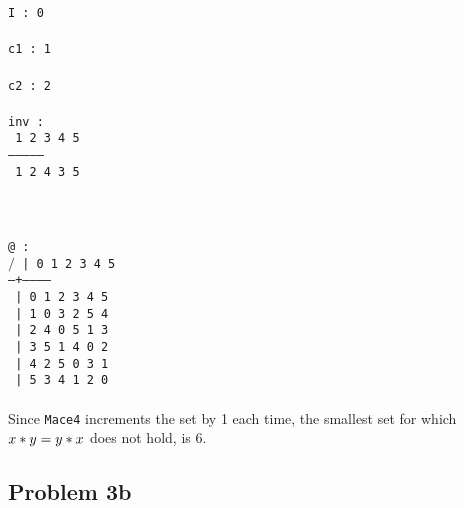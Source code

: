 \documentclass[a4paper]{article}
\begin{document}
	{\tt I : 0}\\
	{\tt }\\
	{\tt c1 : 1}\\
	{\tt }\\
	{\tt c2 : 2}\\
	{\tt }\\
	{\tt inv :}\\
	{\tt {} 1 2 3 4 5}\\
	{\tt ---------------}\\
	{\tt {} 1 2 4 3 5}\\
	{\tt }\\
	\\
	\\
	{\tt @ :}\\
	{\tt \indent $/$ | 0 1 2 3 4 5}\\
	{\tt \indent --+------------}\\
	{\tt {} | 0 1 2 3 4 5}\\
	{\tt {} | 1 0 3 2 5 4}\\
	{\tt {} | 2 4 0 5 1 3}\\
	{\tt {} | 3 5 1 4 0 2}\\
	{\tt {} | 4 2 5 0 3 1}\\
	{\tt {} | 5 3 4 1 2 0}\\
	\\
	Since {\tt Mace4} increments the set by 1 each time, the smallest set for which\\ $x \** y = y \** x$ does not hold, is 6.
	
	\subsection*{Problem 3b}
	
	
\end{document}
